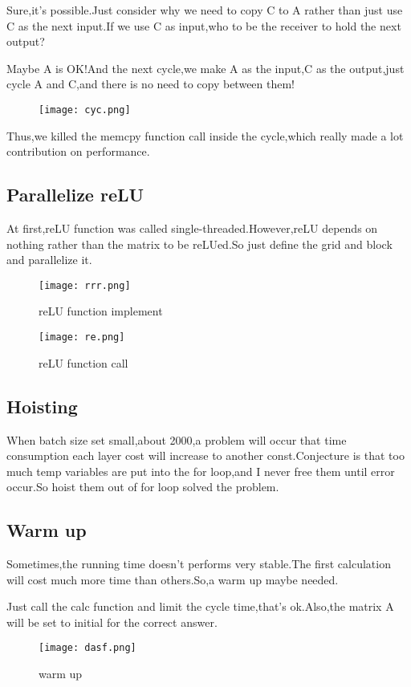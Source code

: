 \documentclass[12pt]{scrartcl} %
\begin{document}
Sure,it's possible.Just consider why we need to copy C to A rather than just use C as the next input.If we use C as input,who to be the receiver to hold the next output?

Maybe A is OK!And the next cycle,we make A as the input,C as the output,just cycle A and C,and there is no need to copy between them!
\begin{figure}[H]
    \centering
    \texttt{[image: cyc.png]}
\end{figure}
Thus,we killed the memcpy function call inside the cycle,which really made a lot contribution on performance.

\subsection{Parallelize reLU}
At first,reLU function was called single-threaded.However,reLU depends on nothing rather than the matrix to be reLUed.So just define the grid and block and parallelize it.
\begin{figure}[H]
    \centering
    \texttt{[image: rrr.png]}
    \caption{reLU function implement}
\end{figure}
\begin{figure}[H]
    \centering
    \texttt{[image: re.png]}
    \caption{reLU function call}
\end{figure}
\subsection{Hoisting}
When batch size set small,about 2000,a problem will occur that time consumption each layer cost will increase to another const.Conjecture is that too much temp variables are put into the for loop,and I never free them until error occur.So hoist them out of for loop solved the problem.
\subsection{Warm up}
Sometimes,the running time doesn't performs very stable.The first calculation will cost much more time than others.So,a warm up maybe needed.

Just call the calc function and limit the cycle time,that's ok.Also,the matrix A will be set to initial for the correct answer.
\begin{figure}[H]
    \centering
    \texttt{[image: dasf.png]}
    \caption{warm up}
\end{figure}
\end{document}
